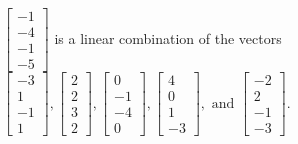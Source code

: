 \begin{exercise}
\begin{exerciseStatement}
  \end{exerciseStatement}
  \begin{exerciseAnswer}
   \(\left[\begin{array}{c}
-1 \\
-4 \\
-1 \\
-5
\end{array}\right]\) 
  	 is  
	a linear combination of the vectors \(\left[\begin{array}{c}
-3 \\
1 \\
-1 \\
1
\end{array}\right] , \left[\begin{array}{c}
2 \\
2 \\
3 \\
2
\end{array}\right] , \left[\begin{array}{c}
0 \\
-1 \\
-4 \\
0
\end{array}\right] , \left[\begin{array}{c}
4 \\
0 \\
1 \\
-3
\end{array}\right] , \text{ and } \left[\begin{array}{c}
-2 \\
2 \\
-1 \\
-3
\end{array}\right]\).

	
  


  \end{exerciseAnswer}
\end{exercise}
